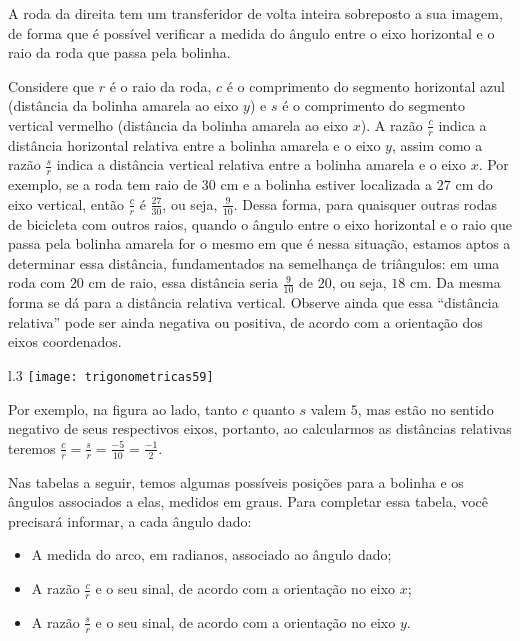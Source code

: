 \documentclass[10 pt,usenames,dvipsnames, oneside]{article}
\begin{document}
A roda da direita tem um transferidor de volta inteira sobreposto a sua imagem, de forma que é possível verificar a medida do ângulo entre o eixo horizontal e o raio da roda que passa pela bolinha.

Considere que $r$ é o raio da roda, $c$ é o comprimento do segmento horizontal azul (distância da bolinha amarela ao eixo $y$) e $s$ é o comprimento do segmento vertical vermelho (distância da bolinha amarela ao eixo $x$). A razão $\frac{c}{r}$ indica a distância horizontal relativa entre a bolinha amarela e o eixo $y$, assim como a razão $\frac{s}{r}$ indica a distância vertical relativa entre a bolinha amarela e o eixo $x$. Por exemplo, se a roda tem raio de $30$ cm e a bolinha estiver localizada a $27$ cm do eixo vertical, então $\frac{c}{r}$ é $\frac{27}{30}$, ou seja, $\frac{9}{10}$. Dessa forma, para quaisquer outras rodas de bicicleta com outros raios, quando o ângulo entre o eixo horizontal e o raio que passa pela bolinha amarela for o mesmo em que é nessa situação, estamos aptos a determinar essa distância, fundamentados na semelhança de triângulos: em uma roda com $20$ cm de raio, essa distância seria $\frac{9}{10}$ de $20$, ou seja, $18$ cm. Da mesma forma se dá para a distância relativa vertical. Observe ainda que essa “distância relativa”{} pode ser ainda negativa ou positiva, de acordo com a orientação dos eixos coordenados.


\begin{wrapfigure}[8]{l}{.3\linewidth}
\vspace{-1em}
\texttt{[image: trigonometricas59]}
\end{wrapfigure}

Por exemplo, na figura ao lado, tanto $c$ quanto $s$ valem $5$, mas estão no sentido negativo de seus respectivos eixos, portanto, ao calcularmos as distâncias relativas teremos $\frac{c}{r}=\frac{s}{r}=\frac{-5}{10}=\frac{-1}{2}$.  

Nas tabelas a seguir, temos algumas possíveis posições para a bolinha e os ângulos associados a elas, medidos em graus. Para completar essa tabela, você precisará informar, a cada ângulo dado:

\begin{itemize}
\item A medida do arco, em radianos, associado ao ângulo dado;
\item A razão $\frac{c}{r}$ e o seu sinal, de acordo com a orientação no eixo $x$;
\item A razão $\frac{s}{r}$ e o seu sinal, de acordo com a orientação no eixo $y$.
\end{itemize}
\end{document}
